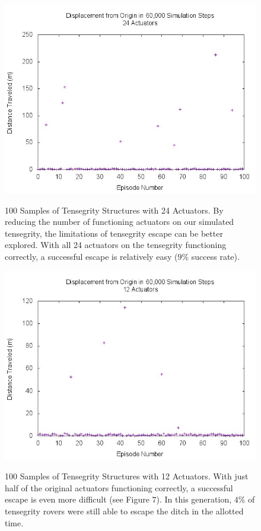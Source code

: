 \begin{figure}[thpb]
\centering
{\includegraphics[width=0.8\linewidth]{tex/ARMS_2015/Pictures/dists100.jpg}} 
\caption{100 Samples of Tensegrity Structures with 24 Actuators. By reducing the number of functioning actuators on our simulated tensegrity, the limitations of tensegrity escape can be better explored.
With all 24 actuators on the tensegrity functioning correctly, a successful escape is relatively easy ($9\%$ success rate).}
\label{robust24scatter}
\end{figure}
                       
\begin{figure}[thpb]
\centering
{\includegraphics[width=0.8\linewidth]{tex/ARMS_2015/Pictures/dists50.jpg}} 
\caption{100 Samples of Tensegrity Structures with 12 Actuators. With just half of the original actuators functioning correctly, a successful escape is even more difficult (see Figure $7$).
In this generation, $4\%$ of tensegrity rovers were still able to escape the ditch in the allotted time.}
\label{robust12scatter}
\end{figure}

